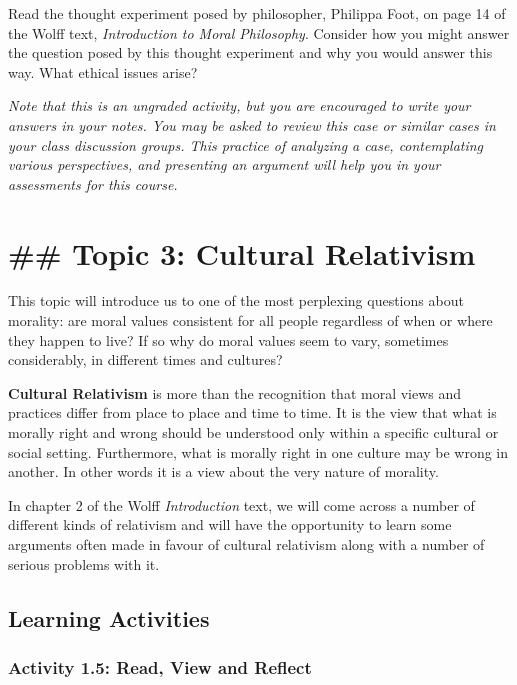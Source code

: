 \documentclass[
]{book}
\begin{document}
Read the thought experiment posed by philosopher, Philippa Foot, on page 14 of the Wolff text, \emph{Introduction to Moral Philosophy}. Consider how you might answer the question posed by this thought experiment and why you would answer this way. What ethical issues arise?

\emph{Note that this is an ungraded activity, but you are encouraged to write your answers in your notes. You may be asked to review this case or similar cases in your class discussion groups. This practice of analyzing a case, contemplating various perspectives, and presenting an argument will help you in your assessments for this course.}

\hypertarget{topic-3-cultural-relativism}{%
\section{\#\# Topic 3: Cultural Relativism}\label{topic-3-cultural-relativism}}

This topic will introduce us to one of the most perplexing questions about
morality: are moral values consistent for all people regardless of when or where
they happen to live? If so why do moral values seem to vary, sometimes
considerably, in different times and cultures?

\textbf{Cultural Relativism} is more than the recognition that moral views and
practices differ from place to place and time to time. It is the view that what
is morally right and wrong should be understood only within a specific cultural
or social setting. Furthermore, what is morally right in one culture may be
wrong in another. In other words it is a view about the very nature of morality.

In chapter 2 of the Wolff \emph{Introduction} text, we will come across a number of
different kinds of relativism and will have the opportunity to learn some
arguments often made in favour of cultural relativism along with a number of
serious problems with it.

\hypertarget{learning-activities-3}{%
\subsection{Learning Activities}\label{learning-activities-3}}

\hypertarget{activity-1.5-read-view-and-reflect}{%
\subsubsection{Activity 1.5: Read, View and Reflect}\label{activity-1.5-read-view-and-reflect}}
\end{document}
